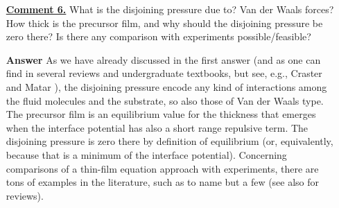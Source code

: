 \documentclass[12pt,english]{article}
\begin{document}
\begin{itemize}
\item[ \textbf{\underline{Comment 6.}}]
{ 
What is the disjoining pressure due to? 
Van der Waals forces? 
How thick is the precursor film, and why should the disjoining pressure be zero there?
Is there any comparison with experiments possible/feasible?
}

\item[ \textbf{{Answer}}]
{
As we have already discussed in the first answer (and as one can find 
in several reviews and undergraduate textbooks, but see, e.g., Craster 
and Matar \cite{craster2009dynamics}), the disjoining pressure encode 
any kind of interactions among the fluid molecules and the substrate, so 
also those of Van der Waals type. The precursor film is an equilibrium value for the thickness that emerges when the interface potential has also a short 
range repulsive term. The disjoining pressure is zero there by definition of equilibrium (or, equivalently, because that is a minimum of the interface potential). Concerning comparisons of a thin-film equation approach with 
experiments, there are tons of examples in the literature, such as 
\cite{becker2003complex,fetzer2005new,PhysRevLett.99.114503} to name but a few (see also \cite{craster2009dynamics,RevModPhys.81.739} for reviews). 
}

\end{itemize}




\end{document}
